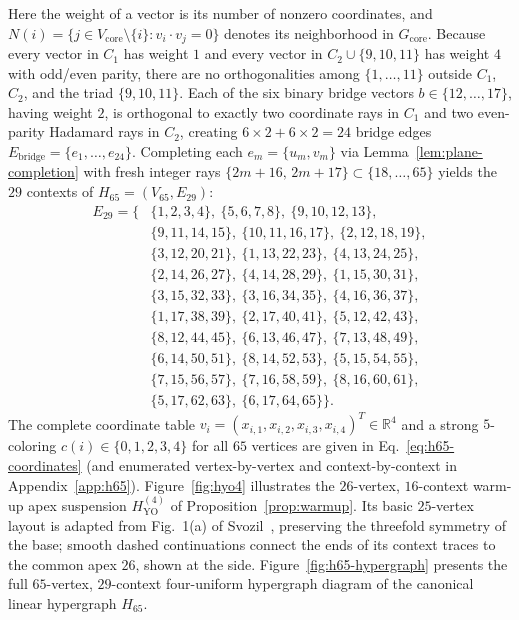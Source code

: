 \documentclass[
  aps,
  pra,
  reprint,
  superscriptaddress,
  amsmath,
  amssymb,
  nofootinbib,
  floatfix
]{revtex4-2}
\theoremstyle{definition}
\theoremstyle{remark}
\newcommand{\R}{\mathbb{R}}
\newcommand{\YO}{\mathrm{YO}}
\begin{document}
Here the weight of a vector is its number of nonzero coordinates, and $N(i)=\{j\in V_{\mathrm{core}}\setminus\{i\}:v_i\cdot v_j=0\}$ denotes its neighborhood in $G_{\mathrm{core}}$. Because every vector in $C_1$ has weight $1$ and every vector in $C_2\cup\{9,10,11\}$ has weight $4$ with odd/even parity, there are no orthogonalities among $\{1,\ldots,11\}$ outside $C_1$, $C_2$, and the triad $\{9,10,11\}$. Each of the six binary bridge vectors $b\in\{12,\ldots,17\}$, having weight $2$, is orthogonal to exactly two coordinate rays in $C_1$ and two even-parity Hadamard rays in $C_2$, creating $6\times 2+6\times 2=24$ bridge edges $E_{\mathrm{bridge}}=\{e_1,\ldots,e_{24}\}$. Completing each $e_m=\{u_m,v_m\}$ via Lemma~\ref{lem:plane-completion} with fresh integer rays $\{2m+16,\,2m+17\}\subset\{18,\ldots,65\}$ yields the $29$ contexts of $H_{65}=(V_{65},E_{29})$:
\begin{equation}\label{eq:h65-contexts}
\begin{aligned}
E_{29}=\bigl\{
&\{1,2,3,4\},\ \{5,6,7,8\},\ \{9,10,12,13\},\\
&\{9,11,14,15\},\ \{10,11,16,17\},\ \{2,12,18,19\},\\
&\{3,12,20,21\},\ \{1,13,22,23\},\ \{4,13,24,25\},\\
&\{2,14,26,27\},\ \{4,14,28,29\},\ \{1,15,30,31\},\\
&\{3,15,32,33\},\ \{3,16,34,35\},\ \{4,16,36,37\},\\
&\{1,17,38,39\},\ \{2,17,40,41\},\ \{5,12,42,43\},\\
&\{8,12,44,45\},\ \{6,13,46,47\},\ \{7,13,48,49\},\\
&\{6,14,50,51\},\ \{8,14,52,53\},\ \{5,15,54,55\},\\
&\{7,15,56,57\},\ \{7,16,58,59\},\ \{8,16,60,61\},\\
&\{5,17,62,63\},\ \{6,17,64,65\}
\bigr\}.
\end{aligned}
\end{equation}
The complete coordinate table $v_i=(x_{i,1},x_{i,2},x_{i,3},x_{i,4})^T\in\R^4$ and a strong $5$-coloring $c(i)\in\{0,1,2,3,4\}$ for all $65$ vertices are given in Eq.~\eqref{eq:h65-coordinates} (and enumerated vertex-by-vertex and context-by-context in Appendix~\ref{app:h65}). Figure~\ref{fig:hyo4} illustrates the $26$-vertex, $16$-context warm-up apex suspension $H_{\YO}^{(4)}$ of Proposition~\ref{prop:warmup}. Its basic $25$-vertex layout is adapted from Fig.~1(a) of Svozil~\cite{svozil-2025-color}, preserving the threefold symmetry of the base; smooth dashed continuations connect the ends of its context traces to the common apex $26$, shown at the side. Figure~\ref{fig:h65-hypergraph} presents the full $65$-vertex, $29$-context four-uniform hypergraph diagram of the canonical linear hypergraph $H_{65}$.
\end{document}
